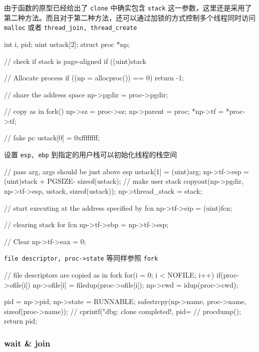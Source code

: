 由于函数的原型已经给出了 \texttt{clone} 中确实包含 \texttt{stack} 这一参数，这里还是采用了第二种方法。而且对于第二种方法，还可以通过加锁的方式控制多个线程同时访问 \texttt{malloc} 或者 \texttt{thread\_join, thread\_create}

\begin{ccode}
	int i, pid;
	uint ustack[2];
	struct proc *np;
					
	// check if stack is page-aligned
	if ((uint)stack %
					
	// Allocate process
	if ((np = allocproc()) == 0)
	return -1;
					
	// share the address space
	np->pgdir = proc->pgdir;
					
	// copy as in fork()
	np->sz = proc->sz;
	np->parent = proc;
	*np->tf = *proc->tf;
					
	// fake pc
	ustack[0] = 0xffffffff;
					
\end{ccode}

设置 \texttt{esp, ebp} 到指定的用户栈可以初始化线程的栈空间

\begin{ccode}
	// pass arg, args should be just above esp
	ustack[1] = (uint)arg;
	np->tf->esp = (uint)stack + PGSIZE- sizeof(ustack);
	// make user stack
	copyout(np->pgdir, np->tf->esp, ustack, sizeof(ustack));
	np->thread_stack = stack;
				  
	// start executing at the address specified by fcn
	np->tf->eip = (uint)fcn;
				  
	// clearing stack for fcn
	np->tf->ebp = np->tf->esp;
				  
	// Clear %
	np->tf->eax = 0;
\end{ccode}

\texttt{file descriptor, proc->state} 等同样参照 \texttt{fork}

\begin{ccode}
	// file descriptors are copied as in fork
	for(i = 0; i < NOFILE; i++)
	if(proc->ofile[i])
	np->ofile[i] = filedup(proc->ofile[i]);
	np->cwd = idup(proc->cwd);
				   
	pid = np->pid;
	np->state = RUNNABLE;
	safestrcpy(np->name, proc->name, sizeof(proc->name));
	// cprintf("dbg: clone completed!, pid=%
	// procdump();
	return pid;
\end{ccode}

\subsubsection{wait \& join}

